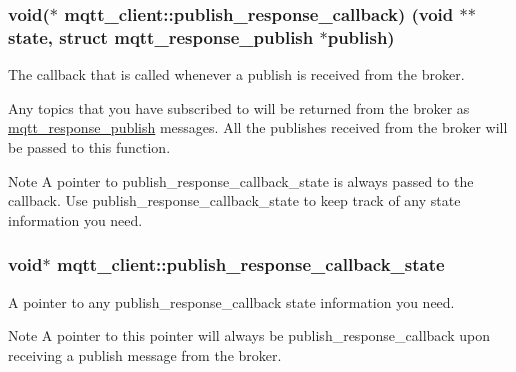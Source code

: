 \subsubsection[{\texorpdfstring{publish\+\_\+response\+\_\+callback}{publish_response_callback}}]{\setlength{\rightskip}{0pt plus 5cm}void($\ast$ mqtt\+\_\+client\+::publish\+\_\+response\+\_\+callback) (void $\ast$$\ast$state, struct {\bf mqtt\+\_\+response\+\_\+publish} $\ast$publish)}\hypertarget{structmqtt__client_a21b907c0e4686e4ae9adf8693626c313}{}\label{structmqtt__client_a21b907c0e4686e4ae9adf8693626c313}


The callback that is called whenever a publish is received from the broker. 

Any topics that you have subscribed to will be returned from the broker as \hyperlink{structmqtt__response__publish}{mqtt\+\_\+response\+\_\+publish} messages. All the publishes received from the broker will be passed to this function.

\begin{DoxyNote}{Note}
A pointer to publish\+\_\+response\+\_\+callback\+\_\+state is always passed to the callback. Use publish\+\_\+response\+\_\+callback\+\_\+state to keep track of any state information you need. 
\end{DoxyNote}
\subsubsection[{\texorpdfstring{publish\+\_\+response\+\_\+callback\+\_\+state}{publish_response_callback_state}}]{\setlength{\rightskip}{0pt plus 5cm}void$\ast$ mqtt\+\_\+client\+::publish\+\_\+response\+\_\+callback\+\_\+state}\hypertarget{structmqtt__client_a948d816462128ef2216c230644407f21}{}\label{structmqtt__client_a948d816462128ef2216c230644407f21}


A pointer to any publish\+\_\+response\+\_\+callback state information you need. 

\begin{DoxyNote}{Note}
A pointer to this pointer will always be publish\+\_\+response\+\_\+callback upon receiving a publish message from the broker. 
\end{DoxyNote}
